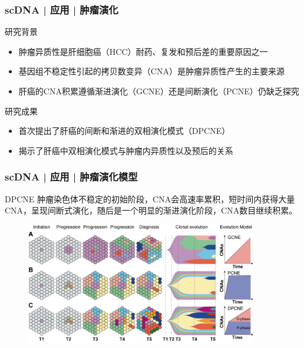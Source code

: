 \documentclass[11pt]{ctexbeamer}
\begin{document}
\begin{frame}
  \frametitle{scDNA | 应用 | 肿瘤演化}
  \begin{block}{研究背景}
    \begin{itemize}
      \item 肿瘤异质性是肝细胞癌（HCC）耐药、复发和预后差的重要原因之一
      \item 基因组不稳定性引起的拷贝数变异（CNA）是肿瘤异质性产生的主要来源
      \item 肝癌的CNA积累遵循渐进演化（GCNE）还是间断演化（PCNE）仍缺乏探究
    \end{itemize}
  \end{block}
  \begin{block}{研究成果}
    \begin{itemize}
      \item 首次提出了肝癌的间断和渐进的双相演化模式（DPCNE）
      \item 揭示了肝癌中双相演化模式与肿瘤内异质性以及预后的关系
    \end{itemize}
  \end{block}
\end{frame}
\begin{frame}
  \frametitle{scDNA | 应用 | 肿瘤演化模型}
  \begin{block}{DPCNE}
    肿瘤染色体不稳定的初始阶段，CNA会高速率累积，短时间内获得大量CNA，呈现间断式演化，随后是一个明显的渐进演化阶段，CNA数目继续积累。
  \end{block}
  \begin{figure}
    \centering
    \includegraphics[width=0.9\textwidth]{scDNA_CNA_model.png}
  \end{figure}
\end{frame}
\end{document}

